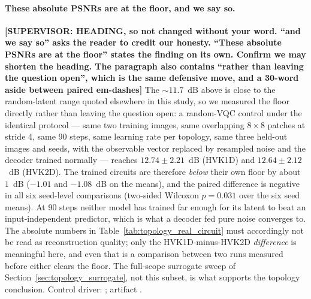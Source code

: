 \documentclass[11pt]{article}
\begin{document}
\paragraph{These absolute PSNRs are at the floor, and we say so.} {\color{red}\textbf{[SUPERVISOR: HEADING, so not changed without your word. ``and we say so'' asks the reader to credit our honesty. ``These absolute PSNRs are at the floor'' states the finding on its own. Confirm we may shorten the heading. The paragraph also contains ``rather than leaving the question open'', which is the same defensive move, and a 30-word aside between paired em-dashes]}} The $\sim\!11.7$~dB above is close to the random-latent range quoted elsewhere in this study, so we measured the floor directly rather than leaving the question open: a random-VQC control under the identical protocol --- same two training images, same overlapping $8\times8$ patches at stride 4, same 90 steps, same learning rate per topology, same three held-out images and seeds, with the observable vector replaced by resampled noise and the decoder trained normally --- reaches $12.74\pm2.21$~dB (HVK1D) and $12.64\pm2.12$~dB (HVK2D). The trained circuits are therefore \emph{below} their own floor by about $1$~dB ($-1.01$ and $-1.08$~dB on the means), and the paired difference is negative in all six seed-level comparisons (two-sided Wilcoxon $p=0.031$ over the six seed means). At 90 steps neither model has trained far enough for its latent to beat an input-independent predictor, which is what a decoder fed pure noise converges to. The absolute numbers in Table~\ref{tab:topology_real_circuit} must accordingly not be read as reconstruction quality; only the HVK1D-minus-HVK2D \emph{difference} is meaningful here, and even that is a comparison between two runs measured before either clears the floor. The full-scope surrogate sweep of Section~\ref{sec:topology_surrogate}, not this subset, is what supports the topology conclusion. Control driver: ; artifact .
\end{document}
